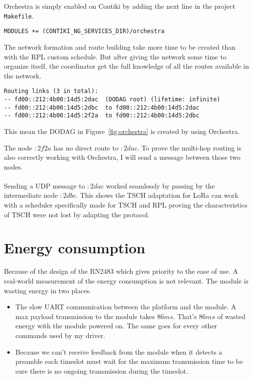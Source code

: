 Orchestra is simply enabled on Contiki by adding the next line in the project
\lstinline{Makefile}.

\begin{lstlisting}
MODULES += (CONTIKI_NG_SERVICES_DIR)/orchestra
\end{lstlisting}

The network formation and route building take more time to be created than with
the RPL custom schedule.
But after giving the network some time to organize itself, the coordinator get
the full knowledge of all the routes available in the network.

\begin{lstlisting}
Routing links (3 in total):
-- fd00::212:4b00:14d5:2dac  (DODAG root) (lifetime: infinite)
-- fd00::212:4b00:14d5:2dbc  to fd00::212:4b00:14d5:2dac
-- fd00::212:4b00:14d5:2f2a  to fd00::212:4b00:14d5:2dbc
\end{lstlisting}

This mean the DODAG in Figure~\ref{fig:orchestra} is created by using Orchestra.



The node $:2f2a$ has no direct route to $:2dac$. 
To prove the multi-hop routing is also correctly working with Orchestra, I will
send a message between those two nodes.

\paragraph{}

Sending a UDP message to $:2dac$ worked seamlessly by passing by the
intermediate node $:2dbc$.
This shows the TSCH adaptation for LoRa can work with a scheduler specifically
made for TSCH and RPL proving the characteristics of TSCH were not lost by
adapting the protocol.

\section{Energy consumption\label{section:energyconsumption}}

Because of the design of the RN2483 which gives priority to the ease of use.
A real-world measurement of the energy consumption is not relevant.
The module is wasting energy in two places.

\begin{itemize}
  \item The slow UART communication between the platform and the module. A max 
    payload transmission to the module takes $86 ms$.  That's $86 ms$ of wasted 
    energy with the module powered on. The same goes for every other commands
    used by my driver.
  \item Because we can't receive feedback from the module when it detects a
    preamble each timeslot must wait for the maximum transmission time to be
    sure there is no ongoing transmission during the timeslot.
\end{itemize}


